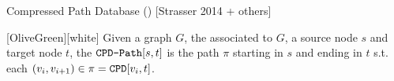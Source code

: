 \begin{frame}{Compressed Path Database (\CPD{}) [Strasser 2014 + others]}
\begin{minipage}{0.50\textwidth}
\begin{center}
        \end{center}     
    \end{minipage}

    \vspace{-5pt}
    \begin{coloredBlock}{\CPDPathName{}}[OliveGreen][white]
        Given a graph $G$, the \CPD{} associated to $G$, a source node $s$ and target node $t$, 
        the $\texttt{CPD-Path}[s, t]$ is the path $\pi$ starting in $s$ and ending in $t$ s.t. each $(v_i, v_{i+1}) \in \pi = \texttt{CPD}{}[v_i, t]$.
    \end{coloredBlock}

\end{frame}
